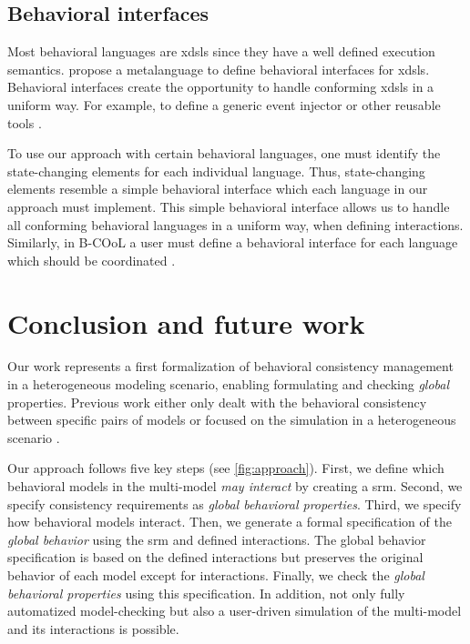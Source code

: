 \documentclass{jot}
\begin{document}
\subsection{Behavioral interfaces}

Most behavioral languages are \glspl{xdsl} since they have a well defined execution semantics.
\cite{leroyBehavioralInterfacesExecutable2020} propose a metalanguage to define behavioral interfaces for \glspl{xdsl}.
Behavioral interfaces create the opportunity to handle conforming \glspl{xdsl} in a uniform way.
For example, to define a generic event injector or other reusable tools \cite{leroyBehavioralInterfacesExecutable2020}.

To use our approach with certain behavioral languages, one must identify the state-changing elements for each individual language.
Thus, state-changing elements resemble a simple behavioral interface which each language in our approach must implement.
This simple behavioral interface allows us to handle all conforming behavioral languages in a uniform way, when defining interactions.
Similarly, in B-COoL a user must define a behavioral interface for each language which should be coordinated \cite{varalarsenBCOolBehavioralCoordination2016}.

\section{Conclusion and future work} \label{sec:conclusion_and_future_work}
Our work represents a first formalization of behavioral consistency management in a heterogeneous modeling scenario, enabling formulating and checking \emph{global} properties.
Previous work either only dealt with the behavioral consistency between specific pairs of models \cite{yaoConsistencyCheckingUML2006, kusterExplicitBehavioralConsistency2003} or focused on the simulation in a heterogeneous scenario \cite{ekerTamingHeterogeneityPtolemy2003, varalarsenBehavioralCoordinationOperator2015}.

Our approach follows five key steps (see \cref{fig:approach}).
First, we define which behavioral models in the multi-model \emph{may interact} by creating a \gls*{srm}.
Second, we specify consistency requirements as \emph{global behavioral properties}.
Third, we specify how behavioral models interact.
Then, we generate a formal specification of the \emph{global behavior} using the \gls*{srm} and defined interactions.
The global behavior specification is based on the defined interactions but preserves the original behavior of each model except for interactions.
Finally, we check the \emph{global behavioral properties} using this specification.
In addition, not only fully automatized model-checking but also a user-driven simulation of the multi-model and its interactions is possible.
\end{document}
